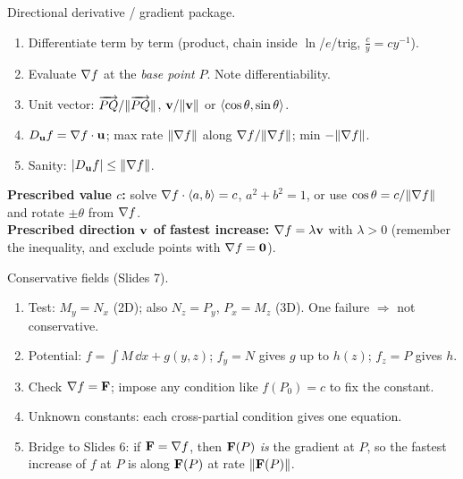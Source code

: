 \begin{strategy}{Directional derivative / gradient package.}
\begin{enumerate}
\item Differentiate term by term (product, chain inside $\ln$/$e$/trig, $\frac{c}{y}=cy^{-1}$).
\item Evaluate $\nabla f$ at the \emph{base point} $P$. Note differentiability.
\item Unit vector: $\overrightarrow{PQ}/\lVert\overrightarrow{PQ}\rVert$, $\mathbf{v}/\lVert\mathbf{v}\rVert$ or $\left\langle \cos\theta,\sin\theta \right\rangle$.
\item $D_{\mathbf{u}} f=\nabla f\cdot\mathbf{u}$; max rate $\lVert\nabla f\rVert$ along $\nabla f/\lVert\nabla f\rVert$; min $-\lVert\nabla f\rVert$.
\item Sanity: $\lvert D_{\mathbf{u}} f\rvert\le\lVert\nabla f\rVert$.
\end{enumerate}
\textbf{Prescribed value $c$:} solve $\nabla f\cdot\left\langle a,b \right\rangle=c$, $a^2+b^2=1$, or use
$\cos\theta=c/\lVert\nabla f\rVert$ and rotate $\pm\theta$ from $\nabla f$.\\
\textbf{Prescribed direction $\mathbf{v}$ of fastest increase:} $\nabla f=\lambda\mathbf{v}$ with $\lambda>0$
(remember the inequality, and exclude points with $\nabla f=\mathbf{0}$).
\end{strategy}

\begin{strategy}{Conservative fields (Slides 7).}
\begin{enumerate}
\item Test: $M_y=N_x$ (2D); also $N_z=P_y$, $P_x=M_z$ (3D). One failure $\Rightarrow$ not conservative.
\item Potential: $f=\int M\,\dd x+g(y,z)$; $f_y=N$ gives $g$ up to $h(z)$; $f_z=P$ gives $h$.
\item Check $\nabla f=\mathbf{F}$; impose any condition like $f(P_0)=c$ to fix the constant.
\item Unknown constants: each cross-partial condition gives one equation.
\item Bridge to Slides 6: if $\mathbf{F}=\nabla f$, then $\mathbf{F}(P)$ \emph{is} the gradient at $P$, so the
      fastest increase of $f$ at $P$ is along $\mathbf{F}(P)$ at rate $\lVert\mathbf{F}(P)\rVert$.
\end{enumerate}
\end{strategy}
